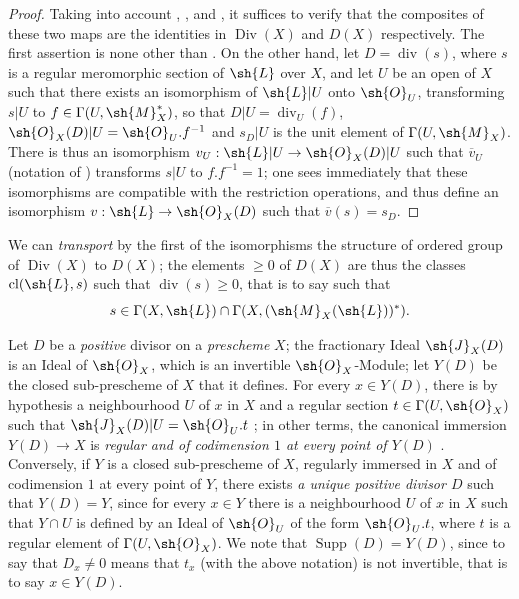 \begin{proof}
Taking into account , , and , it suffices to verify that the composites of these two maps are the identities in $\operatorname{Div}(X)$ and $D(X)$ respectively.
The first assertion is none other than .
On the other hand, let $D=\operatorname{div}(s)$, where $s$ is a regular meromorphic section of $\sh{L}$ over $X$, and let $U$ be an open of $X$ such that there exists an isomorphism of $\sh{L}|U$ onto $\sh{O}_U$, transforming $s|U$ to $f\in\Gamma(U,\sh{M}_X^*)$, so that $D|U=\operatorname{div}_U(f)$, $\sh{O}_X(D)|U=\sh{O}_U.f^{-1}$ and $s_D|U$ is the unit element of $\Gamma(U,\sh{M}_X)$.
There is thus an isomorphism $v_U:\sh{L}|U\to\sh{O}_X(D)|U$ such that $\overline{v}_U$ (notation of ) transforms $s|U$ to $f.f^{-1}=1$;
one sees immediately that these isomorphisms are compatible with the restriction operations, and thus define an isomorphism $v:\sh{L}\to\sh{O}_X(D)$ such that $\overline{v}(s)=s_D$.
\end{proof}

We can \emph{transport} by the first of the isomorphisms  the structure of ordered group of $\operatorname{Div}(X)$ to $D(X)$;
the elements $\geq 0$ of $D(X)$ are thus the classes $\operatorname{cl}(\sh{L},s)$ such that $\operatorname{div}(s)\geq 0$, that is to say  such that
\[
  s\in\Gamma(X,\sh{L})\cap\Gamma(X,(\sh{M}_X(\sh{L}))^*).
\]

\begin{env}[21.2.12]
\label{IV.21.2.12}
Let $D$ be a \emph{positive} divisor on a \emph{prescheme} $X$;
the fractionary Ideal $\sh{J}_X(D)$ is an Ideal of $\sh{O}_X$, which is an invertible $\sh{O}_X$-Module;
let $Y(D)$ be the closed sub-prescheme of $X$ that it defines.
For every $x\in Y(D)$, there is by hypothesis a neighbourhood $U$ of $x$ in $X$ and a regular section $t\in\Gamma(U,\sh{O}_X)$ such that $\sh{J}_X(D)|U=\sh{O}_U.t$ ;
in other terms, the canonical immersion $Y(D)\to X$ is \emph{regular and of codimension $1$ at every point of $Y(D)$} .
Conversely, if $Y$ is a closed sub-prescheme of $X$, regularly immersed in $X$ and of codimension $1$ at every point of $Y$, there exists \emph{a unique positive divisor $D$} such that $Y(D)=Y$, since for every $x\in Y$ there is a neighbourhood $U$ of $x$ in $X$ such that $Y\cap U$ is defined by an Ideal of $\sh{O}_U$ of the form $\sh{O}_U.t$, where $t$ is a regular element of $\Gamma(U,\sh{O}_X)$.
We note that $\operatorname{Supp}(D)=Y(D)$, since to say that $D_x\neq 0$ means that $t_x$ (with the above notation) is not invertible, that is to say $x\in Y(D)$.
\end{env}


